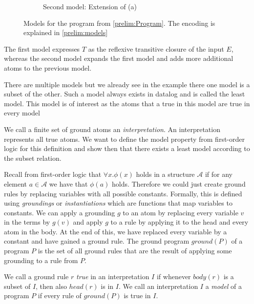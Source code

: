 \begin{example}
\begin{figure}
\begin{subfigure}{0.45\linewidth}
        \caption{Second model: Extension of (a)}
    \end{subfigure}
    \caption{Models for the program from \cref{prelim:Program}. The encoding is explained in \cref{prelim:models}}
    \label{prelim:modelsPict}
    \end{figure}
    
    The first model expresses $T$ as the reflexive transitive closure of the input $E$, whereas the second model expands the first model and adds more additional atoms to the previous model.
\end{example}

There are multiple models but we already see in the example there one model is a subset of the other. Such a model always exists in datalog and is called the least model. This model is of interest as the atoms that a true in this model are true in every model

We call a finite set of ground atoms an \textit{interpretation}. An interpretation represents all true atoms. We want to define the model property from first-order logic for this definition and show then that there exists a least model according to the subset relation.

Recall from first-order logic that $\forall x. \phi(x)$ holds in a structure $\mathcal{A}$ if for any element $a \in \mathcal{A}$ we have that $\phi(a)$ holds. Therefore we could just create ground rules by replacing variables with all possible constants.
Formally, this is defined using \textit{groundings} or \textit{instantiations} which are functions that map variables to constants. We can apply a grounding $g$ to an atom by replacing every variable $v$ in the terms by $g(v)$ and apply $g$ to a rule by applying it to the head and every atom in the body. At the end of this, we have replaced every variable by a constant and have gained a ground rule. 
The ground program $ground(P)$ of a program $P$ is the set of all ground rules that are the result of applying some grounding to a rule from $P$.

We call a ground rule $r$ \textit{true} in an interpretation $I$ if whenever $body(r)$ is a subset of $I$, then also $head(r)$ is in $I$.  We call an interpretation $I$ a \textit{model} of a program $P$ if every rule of $ground(P)$ is true in $I$.

